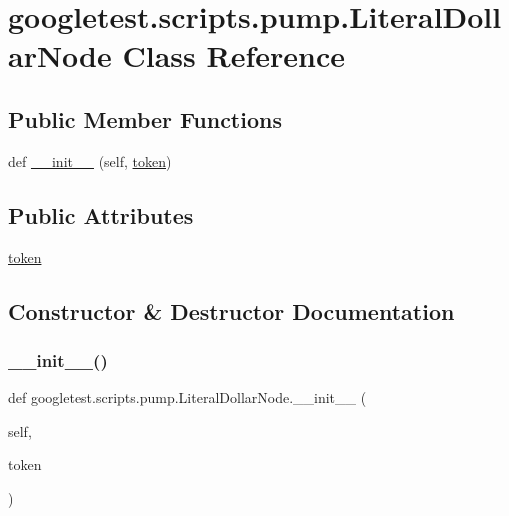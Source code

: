 \hypertarget{classgoogletest_1_1scripts_1_1pump_1_1_literal_dollar_node}{}\section{googletest.\+scripts.\+pump.\+Literal\+Dollar\+Node Class Reference}
\label{classgoogletest_1_1scripts_1_1pump_1_1_literal_dollar_node}
\subsection*{Public Member Functions}
\begin{DoxyCompactItemize}
\item 
def \mbox{\hyperlink{classgoogletest_1_1scripts_1_1pump_1_1_literal_dollar_node_a39dab11c265f4fb2303177071236b59e}{\+\_\+\+\_\+init\+\_\+\+\_\+}} (self, \mbox{\hyperlink{classgoogletest_1_1scripts_1_1pump_1_1_literal_dollar_node_a17502f972bd3dbd33a7aa470f9f41b05}{token}})
\end{DoxyCompactItemize}
\subsection*{Public Attributes}
\begin{DoxyCompactItemize}
\item 
\mbox{\hyperlink{classgoogletest_1_1scripts_1_1pump_1_1_literal_dollar_node_a17502f972bd3dbd33a7aa470f9f41b05}{token}}
\end{DoxyCompactItemize}


\subsection{Constructor \& Destructor Documentation}
\mbox{\label{classgoogletest_1_1scripts_1_1pump_1_1_literal_dollar_node_a39dab11c265f4fb2303177071236b59e}} 
\subsubsection{\texorpdfstring{\_\_init\_\_()}{\_\_init\_\_()}}
{\footnotesize\ttfamily def googletest.\+scripts.\+pump.\+Literal\+Dollar\+Node.\+\_\+\+\_\+init\+\_\+\+\_\+ (\begin{DoxyParamCaption}\item[{}]{self,  }\item[{}]{token }\end{DoxyParamCaption})}



